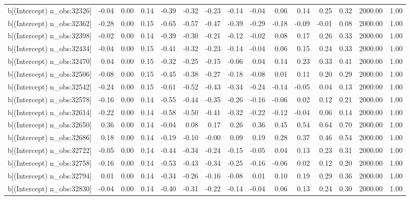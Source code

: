 \begin{table}[ht]
\begin{tabular}{rrrrrrrrrrrrrrr}
  b[(Intercept) n\_obs:32326] & -0.04 & 0.00 & 0.14 & -0.39 & -0.32 & -0.23 & -0.14 & -0.04 & 0.06 & 0.14 & 0.25 & 0.32 & 2000.00 & 1.00 \\ 
  b[(Intercept) n\_obs:32362] & -0.28 & 0.00 & 0.15 & -0.65 & -0.57 & -0.47 & -0.39 & -0.29 & -0.18 & -0.09 & -0.01 & 0.08 & 2000.00 & 1.00 \\ 
  b[(Intercept) n\_obs:32398] & -0.02 & 0.00 & 0.14 & -0.39 & -0.30 & -0.21 & -0.12 & -0.02 & 0.08 & 0.17 & 0.26 & 0.33 & 2000.00 & 1.00 \\ 
  b[(Intercept) n\_obs:32434] & -0.04 & 0.00 & 0.15 & -0.41 & -0.32 & -0.23 & -0.14 & -0.04 & 0.06 & 0.15 & 0.24 & 0.33 & 2000.00 & 1.00 \\ 
  b[(Intercept) n\_obs:32470] & 0.04 & 0.00 & 0.15 & -0.32 & -0.25 & -0.15 & -0.06 & 0.04 & 0.14 & 0.23 & 0.33 & 0.41 & 2000.00 & 1.00 \\ 
  b[(Intercept) n\_obs:32506] & -0.08 & 0.00 & 0.15 & -0.45 & -0.38 & -0.27 & -0.18 & -0.08 & 0.01 & 0.11 & 0.20 & 0.29 & 2000.00 & 1.00 \\ 
  b[(Intercept) n\_obs:32542] & -0.24 & 0.00 & 0.15 & -0.61 & -0.52 & -0.43 & -0.34 & -0.24 & -0.14 & -0.05 & 0.04 & 0.13 & 2000.00 & 1.00 \\ 
  b[(Intercept) n\_obs:32578] & -0.16 & 0.00 & 0.14 & -0.55 & -0.44 & -0.35 & -0.26 & -0.16 & -0.06 & 0.02 & 0.12 & 0.21 & 2000.00 & 1.00 \\ 
  b[(Intercept) n\_obs:32614] & -0.22 & 0.00 & 0.14 & -0.58 & -0.50 & -0.41 & -0.32 & -0.22 & -0.12 & -0.04 & 0.06 & 0.14 & 2000.00 & 1.00 \\ 
  b[(Intercept) n\_obs:32650] & 0.36 & 0.00 & 0.14 & -0.04 & 0.08 & 0.17 & 0.26 & 0.36 & 0.45 & 0.54 & 0.64 & 0.70 & 2000.00 & 1.00 \\ 
  b[(Intercept) n\_obs:32686] & 0.18 & 0.00 & 0.14 & -0.19 & -0.10 & -0.00 & 0.09 & 0.19 & 0.28 & 0.37 & 0.46 & 0.54 & 2000.00 & 1.00 \\ 
  b[(Intercept) n\_obs:32722] & -0.05 & 0.00 & 0.14 & -0.44 & -0.34 & -0.24 & -0.15 & -0.05 & 0.04 & 0.13 & 0.23 & 0.31 & 2000.00 & 1.00 \\ 
  b[(Intercept) n\_obs:32758] & -0.16 & 0.00 & 0.14 & -0.53 & -0.43 & -0.34 & -0.25 & -0.16 & -0.06 & 0.02 & 0.12 & 0.20 & 2000.00 & 1.00 \\ 
  b[(Intercept) n\_obs:32794] & 0.01 & 0.00 & 0.14 & -0.34 & -0.26 & -0.16 & -0.08 & 0.01 & 0.10 & 0.19 & 0.29 & 0.36 & 2000.00 & 1.00 \\ 
  b[(Intercept) n\_obs:32830] & -0.04 & 0.00 & 0.14 & -0.40 & -0.31 & -0.22 & -0.14 & -0.04 & 0.06 & 0.13 & 0.24 & 0.30 & 2000.00 & 1.00 \\ 

\end{tabular}
\end{table}
